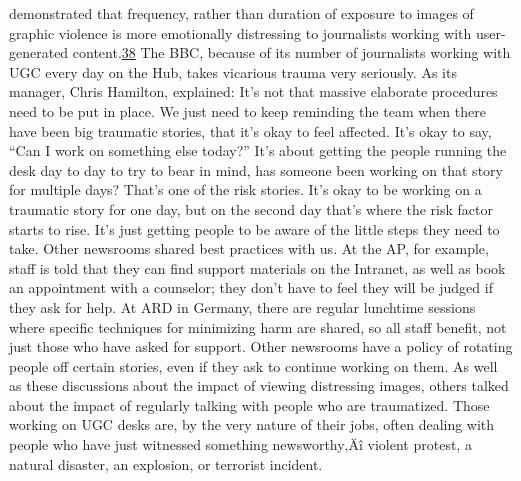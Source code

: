 \documentclass[symmetric, notoc, nobib]{towcenter-book}
\begin{document}
demonstrated that frequency, rather than duration of exposure to images of
graphic violence is more emotionally distressing to journalists working with
user-generated content.{\href{#endnotes}{38}}
The BBC, because of its number of journalists working with UGC every day
on the Hub, takes vicarious trauma very seriously. As its manager, Chris
Hamilton, explained:
It's not that massive elaborate procedures need to be put in place.
We just need to keep reminding the team when there have been big
traumatic stories, that it's okay to feel affected. It's okay to say, ``Can I
work on something else today?'' It's about getting the people running
the desk day to day to try to bear in mind, has someone been working
on that story for multiple days? That's one of the risk stories. It's okay
to be working on a traumatic story for one day, but on the second day
that's where the risk factor starts to rise. It's just getting people to be
aware of the little steps they need to take.
Other newsrooms shared best practices with us. At the AP, for example,
staff is told that they can find support materials on the Intranet, as well as
book an appointment with a counselor; they don't have to feel they will be
judged if they ask for help. At ARD in Germany, there are regular lunchtime
sessions where specific techniques for minimizing harm are shared, so all
staff benefit, not just those who have asked for support. Other newsrooms
have a policy of rotating people off certain stories, even if they ask to continue
working on them.
As well as these discussions about the impact of viewing distressing images,
others talked about the impact of regularly talking with people who are traumatized.
Those working on UGC desks are, by the very nature of their jobs,
often dealing with people who have just witnessed something newsworthy‚Äî
violent protest, a natural disaster, an explosion, or terrorist incident.
\end{document}

